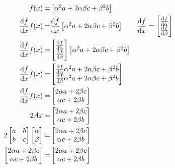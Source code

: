 \documentclass[11pt]{article}
\begin{document}
\begin{align}
				f(x)=&\begin{bmatrix} \alpha^2 a + 2\alpha\beta c +\beta^2b \end{bmatrix}\\
				\dv{f}{x}f(x)=&\dv{f}{x}\begin{bmatrix} \alpha^2 a + 2\alpha\beta c +\beta^2b \end{bmatrix} & \dv{f}{x}=\begin{bmatrix}  \dv{f}{\alpha} \\ \dv{f}{\beta}\end{bmatrix}\\
				\dv{f}{x}f(x)=&\begin{bmatrix} \dv{f}{\alpha} \\ \dv{f}{\beta} \end{bmatrix}\begin{bmatrix} \alpha^2 a + 2\alpha\beta c +\beta^2b \end{bmatrix} \\
				\dv{f}{x}f(x)=&\begin{bmatrix} \dv{f}{\alpha} \alpha^2 a + 2\alpha\beta c +\beta^2b \\ \dv{f}{\beta}\alpha^2 a + 2\alpha\beta c +\beta^2b \end{bmatrix}\\
				\dv{f}{x}f(x)=&\begin{bmatrix} 2\alpha a + 2\beta c\\ \alpha c +2\beta b \end{bmatrix}\\
				2Ax=&\begin{bmatrix} 2\alpha a + 2\beta c\\ \alpha c +2\beta b \end{bmatrix}\\
				2\begin{bmatrix} a & b \\ b & c  \end{bmatrix} \begin{bmatrix}  \alpha \\ \beta \end{bmatrix}=&\begin{bmatrix} 2\alpha a + 2\beta c\\ \alpha c +2\beta b \end{bmatrix}\\
				\begin{bmatrix} 2\alpha a + 2\beta c\\ \alpha c +2\beta b \end{bmatrix}=&\begin{bmatrix} 2\alpha a + 2\beta c\\ \alpha c +2\beta b \end{bmatrix}\\
			\end{align}
\end{document}
